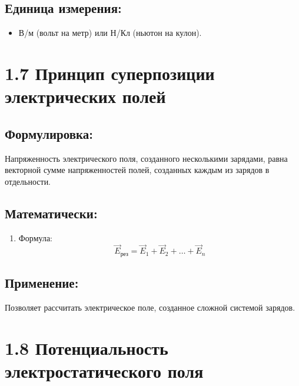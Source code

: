 \documentclass[a4paper,12pt]{article}
\begin{document}
\newpage
\vspace{-9pt}
\subsection*{Единица измерения:}
\vspace{-3pt}
\begin{itemize} [itemsep=0pt, topsep=0pt, parsep=0pt]
  \item В/м (вольт на метр) или Н/Кл (ньютон на кулон).
\end{itemize}

\section*{1.7 Принцип суперпозиции электрических полей}
\vspace{-9pt}
\subsection*{Формулировка:}
\vspace{-3pt}
Напряженность электрического поля, созданного несколькими зарядами, равна векторной сумме напряженностей полей, созданных каждым из зарядов в отдельности.

\vspace{-9pt}
\subsection*{Математически:}
\vspace{-3pt}
\begin{enumerate}[itemsep=0pt, topsep=0pt, parsep=3pt]
  \item Формула:
  \vspace{-0.05em}
  $$ \vec{E}_{\text{рез}} = \vec{E}_1 + \vec{E}_2 + \dots + \vec{E}_n $$
\end{enumerate}

\vspace{-9pt}
\subsection*{Применение:}
\vspace{-3pt}
Позволяет рассчитать электрическое поле, созданное сложной системой зарядов.

\section*{1.8 Потенциальность электростатического поля}
\vspace{-9pt}
\end{document}
